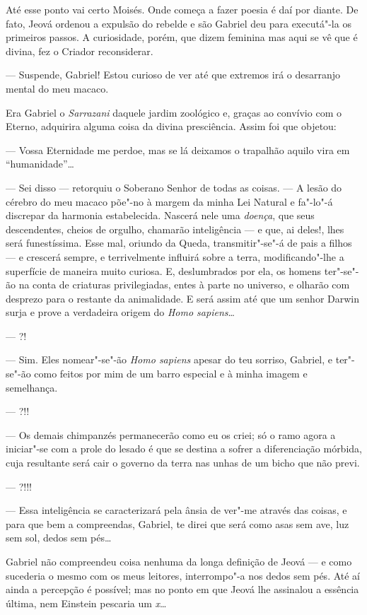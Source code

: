 Até esse ponto vai certo Moisés. Onde começa a fazer poesia é daí por
diante. De fato, Jeová ordenou a expulsão do rebelde e são Gabriel deu
para executá"-la os primeiros passos. A curiosidade, porém, que dizem
feminina mas aqui se vê que é divina, fez o Criador reconsiderar.

--- Suspende, Gabriel! Estou curioso de ver até que extremos irá o
desarranjo mental do meu macaco.

Era Gabriel o \emph{Sarrazani} daquele jardim zoológico e, graças ao
convívio com o Eterno, adquirira alguma coisa da divina presciência.
Assim foi que objetou:

--- Vossa Eternidade me perdoe, mas se lá deixamos o trapalhão aquilo
vira em ``humanidade''\ldots{}

--- Sei disso --- retorquiu o Soberano Senhor de todas as coisas. --- A
lesão do cérebro do meu macaco põe"-no à margem da minha Lei Natural e
fa"-lo"-á discrepar da harmonia estabelecida. Nascerá nele uma
\emph{doença}, que seus descendentes, cheios de orgulho, chamarão
inteligência --- e que, ai deles!, lhes será funestíssima. Esse mal,
oriundo da Queda, transmitir"-se"-á de pais a filhos --- e crescerá
sempre, e terrivelmente influirá sobre a terra, modificando"-lhe a
superfície de maneira muito curiosa. E, deslumbrados por ela, os homens
ter"-se"-ão na conta de criaturas privilegiadas, entes à parte no
universo, e olharão com desprezo para o restante da animalidade. E será
assim até que um senhor Darwin surja e prove a verdadeira origem do
\emph{Homo sapiens}\ldots{}

--- ?!

--- Sim. Eles nomear"-se"-ão \emph{Homo sapiens} apesar do teu sorriso,
Gabriel, e ter"-se"-ão como feitos por mim de um barro especial e à minha
imagem e semelhança.

--- ?!!

--- Os demais chimpanzés permanecerão como eu os criei; só o ramo agora
a iniciar"-se com a prole do lesado é que se destina a sofrer a
diferenciação mórbida, cuja resultante será cair o governo da terra nas
unhas de um bicho que não previ.

--- ?!!!

--- Essa inteligência se caracterizará pela ânsia de ver"-me através das
coisas, e para que bem a compreendas, Gabriel, te direi que será como
asas sem ave, luz sem sol, dedos sem pés\ldots{}

Gabriel não compreendeu coisa nenhuma da longa definição de Jeová --- e
como sucederia o mesmo com os meus leitores, interrompo"-a nos dedos sem
pés. Até aí ainda a percepção é possível; mas no ponto em que Jeová lhe
assinalou a essência última, nem Einstein pescaria um \emph{x}\ldots{}

